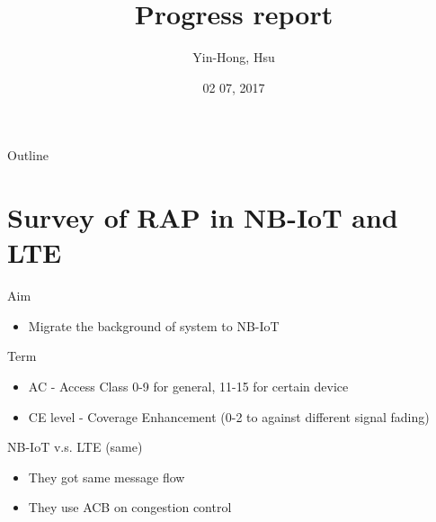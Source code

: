 \documentclass{beamer}
\title {
    Progress report
}
\author {
    Yin-Hong, Hsu
}
\date {
    02 07, 2017
}
\begin{document}
\begin{frame}
    \titlepage
\end{frame}


\begin{frame}{Outline}
    \tableofcontentsgather
    \tableofcontents
\end{frame}


\section{Survey of RAP in NB-IoT and LTE}

\begin{frame}{Aim}
    \begin{itemize}
        \item {Migrate the background of system to NB-IoT}
    \end{itemize}
\end{frame}

\begin{frame}{Term}
    \begin{itemize}
        \item {AC - Access Class 0-9 for general, 11-15 for certain device}
        \item {CE level - Coverage Enhancement (0-2 to against different signal fading)}
    \end{itemize}
\end{frame}

\begin{frame}{NB-IoT v.s. LTE (same)}
    \begin{itemize}
        \item {They got same message flow}
        \item {They use ACB on congestion control}
    \end{itemize}
\end{frame}
\end{document}
